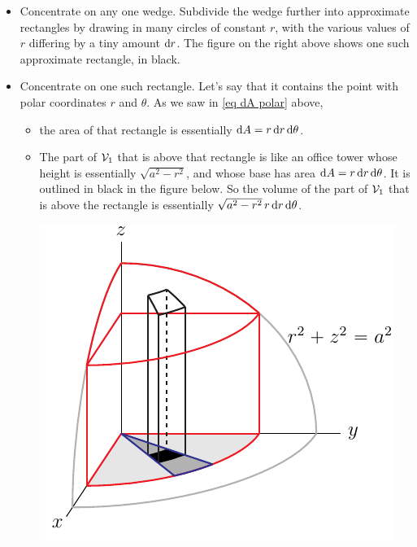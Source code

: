 \begin{eg}
\begin{itemize}
\item
Concentrate on any one wedge. Subdivide the wedge further into
approximate rectangles by drawing in many circles of constant $r$, 
with the various values of $r$ differing by a tiny amount $\mathrm{d}r$.
The figure on the right above shows one such approximate rectangle, in black.
\item
Concentrate on one such rectangle. Let's say that it contains the point 
with polar coordinates $r$ and $\theta$. As we saw in \eqref{eq dA polar} above, 
\begin{itemize}
\item 
the area of that rectangle is essentially $\mathrm{d}A =  r\,\mathrm{d}r\,\mathrm{d}\theta$.
\item
The part of $\mathcal{V}_1$ that is above that rectangle is like an office
tower whose height is essentially 
           $\sqrt{a^2-r^2}$, 
and whose base has area $\mathrm{d}A =  r\,\mathrm{d}r\,\mathrm{d}\theta$. It is 
outlined in black in the figure below.
So the volume of the part of $\mathcal{V}_1 $ that is above the rectangle
is essentially
         $\sqrt{a^2-r^2}\,r\,\mathrm{d}r\,\mathrm{d}\theta$.
\begin{efig}
\begin{center}
    \includegraphics{appleCore3.pdf}
\end{center}
\end{efig}
\end{itemize}


\end{itemize}
\end{eg}
